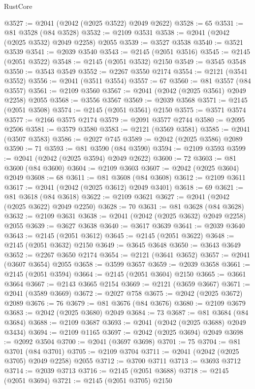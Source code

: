 \begin{lexlean}{RustCore}
\begin{coremodule}
@3527 := @2041 (@2042 (@2025 @3522) @2049 @2622)
@3528 := 65
@3531 := @81 @3528 (@84 @3528)
@3532 := @2109 @3531
@3538 := @2041 (@2042 (@2025 @3532) @2049 @2258) @2055
@3539 := @3527 @3538
@3540 := @3521 @3539
@3541 := @2039 @3540
@3543 := @2145 (@2051 @3516)
@3545 := @2145 (@2051 @3522)
@3548 := @2145 (@2051 @3532) @2150
@3549 := @3545 @3548
@3550 := @3543 @3549
@3552 := @2267 @3550 @2174
@3554 := @2121 (@3541 @3552)
@3556 := @2041 (@3511 @3554)
@3557 := 67
@3560 := @81 @3557 (@84 @3557)
@3561 := @2109 @3560
@3567 := @2041 (@2042 (@2025 @3561) @2049 @2258) @2055
@3568 := @3556 @3567
@3569 := @2039 @3568
@3571 := @2145 (@2051 @3508)
@3574 := @2145 (@2051 @3561) @2150
@3575 := @3571 @3574
@3577 := @2166 @3575 @2174
@3579 := @2091 @3577 @2744
@3580 := @2095 @2506
@3581 := @3579 @3580
@3583 := @2121 (@3569 @3581)
@3585 := @2041 (@3507 @3583)
@3586 := @2027 @745
@3589 := @2042 (@2025 @3586) @2089
@3590 := 71
@3593 := @81 @3590 (@84 @3590)
@3594 := @2109 @3593
@3599 := @2041 (@2042 (@2025 @3594) @2049 @2622)
@3600 := 72
@3603 := @81 @3600 (@84 @3600)
@3604 := @2109 @3603
@3607 := @2042 (@2025 @3604) @2049
@3608 := 68
@3611 := @81 @3608 (@84 @3608)
@3612 := @2109 @3611
@3617 := @2041 (@2042 (@2025 @3612) @2049 @3401)
@3618 := 69
@3621 := @81 @3618 (@84 @3618)
@3622 := @2109 @3621
@3627 := @2041 (@2042 (@2025 @3622) @2049 @2250)
@3628 := 70
@3631 := @81 @3628 (@84 @3628)
@3632 := @2109 @3631
@3638 := @2041 (@2042 (@2025 @3632) @2049 @2258) @2055
@3639 := @3627 @3638
@3640 := @3617 @3639
@3641 := @2039 @3640
@3643 := @2145 (@2051 @3612)
@3645 := @2145 (@2051 @3622)
@3648 := @2145 (@2051 @3632) @2150
@3649 := @3645 @3648
@3650 := @3643 @3649
@3652 := @2267 @3650 @2174
@3654 := @2121 (@3641 @3652)
@3657 := @2041 (@3607 @3654) @2055
@3658 := @3599 @3657
@3659 := @2039 @3658
@3661 := @2145 (@2051 @3594)
@3664 := @2145 (@2051 @3604) @2150
@3665 := @3661 @3664
@3667 := @2143 @3665 @2154
@3669 := @2121 (@3659 @3667)
@3671 := @2041 (@3589 @3669)
@3672 := @2027 @758
@3675 := @2042 (@2025 @3672) @2089
@3676 := 76
@3679 := @81 @3676 (@84 @3676)
@3680 := @2109 @3679
@3683 := @2042 (@2025 @3680) @2049
@3684 := 73
@3687 := @81 @3684 (@84 @3684)
@3688 := @2109 @3687
@3693 := @2041 (@2042 (@2025 @3688) @2049 @3434)
@3694 := @2109 @1165
@3697 := @2042 (@2025 @3694) @2049
@3698 := @2092 @3504
@3700 := @2041 (@3697 @3698)
@3701 := 75
@3704 := @81 @3701 (@84 @3701)
@3705 := @2109 @3704
@3711 := @2041 (@2042 (@2025 @3705) @2049 @2258) @2055
@3712 := @3700 @3711
@3713 := @3693 @3712
@3714 := @2039 @3713
@3716 := @2145 (@2051 @3688)
@3718 := @2145 (@2051 @3694)
@3721 := @2145 (@2051 @3705) @2150

\end{coremodule}
\end{lexlean}
